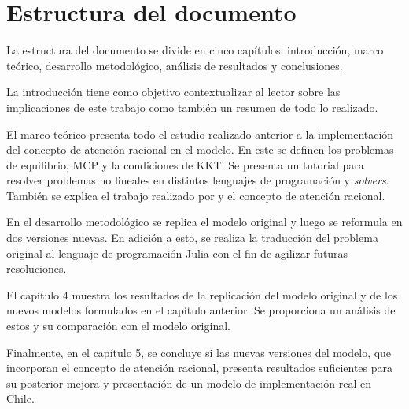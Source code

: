 \section{Estructura del documento}

La estructura del documento se divide en cinco capítulos: introducción, marco teórico, desarrollo metodológico, análisis de resultados y conclusiones.
\vspace{2.5mm}

La introducción tiene como objetivo contextualizar al lector sobre las implicaciones de este trabajo como también un resumen de todo lo realizado.
\vspace{2.5mm}

El marco teórico presenta todo el estudio realizado anterior a la implementación del concepto de atención racional en el modelo. En este se definen los problemas de equilibrio, MCP y la condiciones de KKT. Se presenta un tutorial para resolver problemas no lineales en distintos lenguajes de programación y \textit{solvers}. También se explica el trabajo realizado por  y el concepto de atención racional.
\vspace{2.5mm}

En el desarrollo metodológico se replica el modelo original y luego se reformula en dos versiones nuevas. En adición a esto, se realiza la traducción del problema original al lenguaje de programación Julia con el fin de agilizar futuras resoluciones.
\vspace{2.5mm}

El capítulo 4 muestra los resultados de la replicación del modelo original y de los nuevos modelos formulados en el capítulo anterior. Se proporciona un análisis de estos y su comparación con el modelo original.
\vspace{2.5mm}

Finalmente, en el capítulo 5, se concluye si las nuevas versiones del modelo, que incorporan el concepto de atención racional, presenta resultados suficientes para su posterior mejora y presentación de un modelo de implementación real en Chile.



